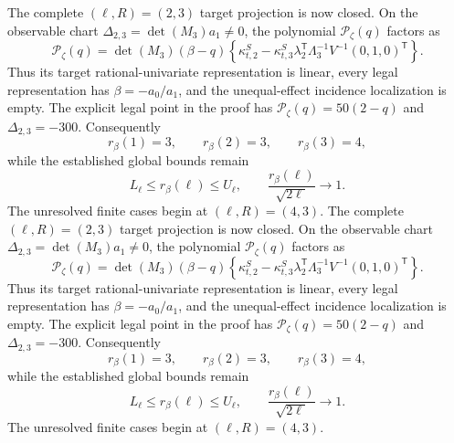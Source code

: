 The complete \((\ell,R)=(2,3)\) target projection is now closed.  On the observable chart \(\Delta_{2,3}=\det(M_3)a_1\ne0\), the polynomial \(\mathcal P_\zeta(q)\) factors as
\[
 \mathcal P_\zeta(q)=\det(M_3)(\beta-q)
 \left\{\kappa^S_{t,2}-\kappa^S_{t,3}\lambda_2^{\mathsf T}
 \Lambda_3^{-1}V^{-1}(0,1,0)^{\mathsf T}\right\}.
\]
Thus its target rational-univariate representation is linear, every legal representation has \(\beta=-a_0/a_1\), and the unequal-effect incidence localization is empty.  The explicit legal point in the proof has \(\mathcal P_\zeta(q)=50(2-q)\) and \(\Delta_{2,3}=-300\).  Consequently
\[
 r_\beta(1)=3,\qquad r_\beta(2)=3,\qquad r_\beta(3)=4,
\]
while the established global bounds remain
\[
 L_\ell\le r_\beta(\ell)\le U_\ell,
 \qquad \frac{r_\beta(\ell)}{\sqrt{2\ell}}\longrightarrow1.
\]
The unresolved finite cases begin at \((\ell,R)=(4,3)\).
The complete \((\ell,R)=(2,3)\) target projection is now closed.  On the observable chart \(\Delta_{2,3}=\det(M_3)a_1\ne0\), the polynomial \(\mathcal P_\zeta(q)\) factors as
\[
 \mathcal P_\zeta(q)=\det(M_3)(\beta-q)
 \left\{\kappa^S_{t,2}-\kappa^S_{t,3}\lambda_2^{\mathsf T}
 \Lambda_3^{-1}V^{-1}(0,1,0)^{\mathsf T}\right\}.
\]
Thus its target rational-univariate representation is linear, every legal representation has \(\beta=-a_0/a_1\), and the unequal-effect incidence localization is empty.  The explicit legal point in the proof has \(\mathcal P_\zeta(q)=50(2-q)\) and \(\Delta_{2,3}=-300\).  Consequently
\[
 r_\beta(1)=3,\qquad r_\beta(2)=3,\qquad r_\beta(3)=4,
\]
while the established global bounds remain
\[
 L_\ell\le r_\beta(\ell)\le U_\ell,
 \qquad \frac{r_\beta(\ell)}{\sqrt{2\ell}}\longrightarrow1.
\]
The unresolved finite cases begin at \((\ell,R)=(4,3)\).
